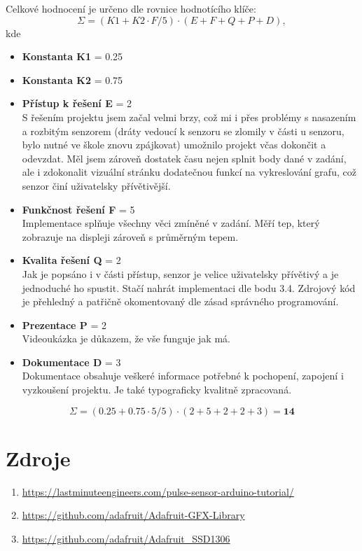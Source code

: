\documentclass[11pt,a4paper]{article}
\begin{document}
Celkové hodnocení je určeno dle rovnice hodnotícího klíče:
\[
\Sigma = (K1 + K2 \cdot F / 5) \cdot (E + F + Q + P + D),
\]
kde
\begin{itemize}
    \item \textbf{Konstanta K1} = 0.25
    \item \textbf{Konstanta K2} = 0.75

\item \textbf{Přístup k řešení E} = 2 \\
S řešením projektu jsem začal velmi brzy, což mi i přes problémy s nasazením a rozbitým senzorem (dráty vedoucí k senzoru se zlomily v části u senzoru, bylo nutné ve škole znovu zpájkovat) umožnilo projekt včas dokončit a odevzdat. Měl jsem zároveň dostatek času nejen splnit body dané v zadání, ale i zdokonalit vizuální stránku dodatečnou funkcí na vykreslování grafu, což senzor činí uživatelsky přívětivější.

    \item \textbf{Funkčnost řešení F} = 5\\
    Implementace splňuje všechny věci zmíněné v zadání. Měří tep, který zobrazuje na displeji zároveň s průměrným tepem.

    \item \textbf{Kvalita řešení Q} = 2\\
    Jak je popsáno i v části přístup, senzor je velice uživatelsky přívětivý a je jednoduché ho spustit. Stačí nahrát implementaci dle bodu 3.4. Zdrojový kód je přehledný a patřičně okomentovaný dle zásad správného programování.

    \item \textbf{Prezentace P} = 2\\
    Videoukázka je důkazem, že vše funguje jak má.

    \item \textbf{Dokumentace D} = 3\\
    Dokumentace obsahuje veškeré informace potřebné k pochopení, zapojení i vyzkoušení projektu. Je také typograficky kvalitně zpracovaná.
\end{itemize}

\[
\Sigma = (0.25 + 0.75 \cdot 5 / 5) \cdot (2 + 5 + 2 + 2 + 3) = \textbf{14}
\]

\section{Zdroje}

\begin{enumerate}[]
    \item \href{https://lastminuteengineers.com/pulse-sensor-arduino-tutorial/}{https://lastminuteengineers.com/pulse-sensor-arduino-tutorial/}
    \item \href{https://github.com/adafruit/Adafruit-GFX-Library}{https://github.com/adafruit/Adafruit-GFX-Library}
    \item \href{https://github.com/adafruit/Adafruit_SSD1306}{https://github.com/adafruit/Adafruit\_SSD1306}
\end{enumerate}
\end{document}
